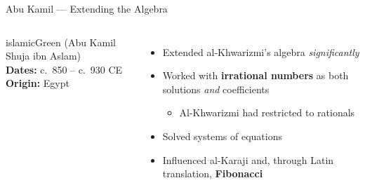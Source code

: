 \begin{frame}[shrink=5]{Abu Kamil --- Extending the Algebra}
  \begin{columns}[T]
    \begin{personbox}{islamicGreen}
      {\small (Abu Kamil Shuja ibn Aslam)}\\[3pt]
      \textbf{Dates:} c.\ 850 -- c.\ 930 CE\\
      \textbf{Origin:} Egypt
    \end{personbox}
    \vspace{0.4em}
    \begin{itemize}
      \item Extended al-Khwarizmi's algebra \emph{significantly}
      \item Worked with \textbf{irrational numbers} as both solutions \emph{and} coefficients
        \begin{itemize}
          \item[\footnotesize$\bullet$] {\footnotesize Al-Khwarizmi had restricted to rationals}
        \end{itemize}
      \item Solved systems of equations
      \item Influenced al-Karaji and, through Latin translation, \textbf{Fibonacci}
    \end{itemize}


    \vspace{0.5em}
  \end{columns}

\end{frame}

